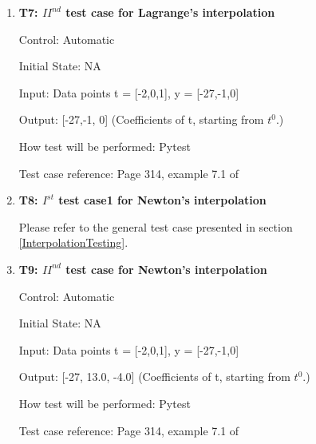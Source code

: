 \documentclass[12pt, titlepage]{article}
\begin{document}
\begin{enumerate}
\\ 



\item{\textbf{T7: ${II}^{nd}$ test case for Lagrange's interpolation} \\}

Control: Automatic

Initial State: NA

Input: Data points t = [-2,0,1], y = [-27,-1,0]

Output: [-27,-1, 0] (Coefficients of t, starting from $t^{0}$.)

How test will be performed: Pytest

Test case reference: Page 314, example 7.1 of  ~\cite{Health1997}\\


\item{\textbf{T8: $I^{st}$ test case1 for Newton's interpolation} \\}

Please refer to the general test case presented in section 
\ref{InterpolationTesting}.


\item{\textbf{T9: ${II}^{nd}$ test case for Newton's interpolation} \\}

Control: Automatic

Initial State: NA

Input: Data points t = [-2,0,1], y = [-27,-1,0]

Output: [-27, 13.0, -4.0] (Coefficients of t, starting from $t^{0}$.)

How test will be performed: Pytest

Test case reference: Page 314, example 7.1 of \cite{Health1997}\\




\end{enumerate}
\end{document}
